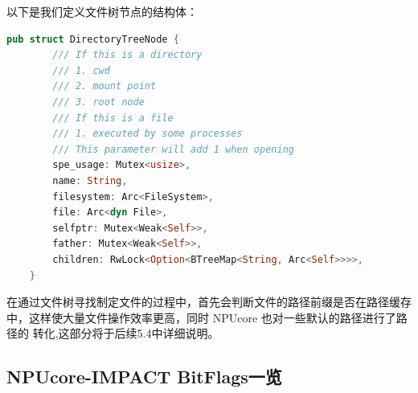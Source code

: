 以下是我们定义文件树节点的结构体：

\begin{lstlisting}[language={rust}, label={code:refill}, caption={FileDescriptor}]
    pub struct DirectoryTreeNode {
        /// If this is a directory
        /// 1. cwd
        /// 2. mount point
        /// 3. root node
        /// If this is a file
        /// 1. executed by some processes
        /// This parameter will add 1 when opening
        spe_usage: Mutex<usize>,
        name: String,
        filesystem: Arc<FileSystem>,
        file: Arc<dyn File>,
        selfptr: Mutex<Weak<Self>>,
        father: Mutex<Weak<Self>>,
        children: RwLock<Option<BTreeMap<String, Arc<Self>>>>,
    }
\end{lstlisting}

在通过文件树寻找制定文件的过程中，首先会判断文件的路径前缀是否在路径缓存
中，这样使大量文件操作效率更高，同时 NPUcore 也对一些默认的路径进行了路径的
转化,这部分将于后续5.4中详细说明。

\subsection{NPUcore-IMPACT BitFlags一览}

